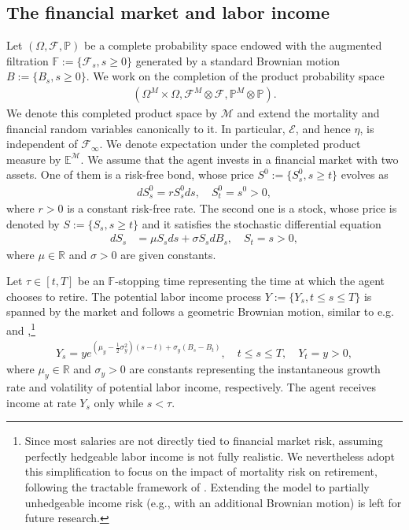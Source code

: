 \documentclass[a4paper,11pt]{amsart}
\numberwithin{equation}{section}
\begin{document}
\subsection{The financial market and labor income}
{
Let $({\Omega},{\mathcal{F}},{\mathbb{P}})$ be a complete probability space endowed with the augmented filtration $\mathbb{F}:=\{\mathcal{F}_s,s\geq0\}$ generated by a standard Brownian motion $B:=\{B_s,s\geq0\}$. We work on the completion of the product probability space
\begin{align*}
(\Omega^M\times\Omega,\mathcal{F}^M\otimes\mathcal{F},\mathbb{P}^M\otimes\mathbb{P}).
\end{align*}
We denote this completed product space by $\mathcal{M}$ and extend the mortality and financial random variables canonically to it. In particular, $\mathcal{E}$, and hence $\eta$, is independent of $\mathcal{F}_\infty$. We denote expectation under the completed product measure by $\mathbb{E}^{\mathcal{M}}$.
}
We assume that the agent invests in a financial market with two assets. One of them is a risk-free bond, whose price $S^0:=\{ S^0_s, s \geq t \}$ evolves as 
\begin{align*}
dS^0_s=rS^0_s ds, \quad S^0_t=s^0>0,
\end{align*}
where $r>0$ is a constant risk-free rate. The second one is a stock, whose price is denoted by $S:=\{S_s, s\geq t\}$ and it satisfies the stochastic differential equation
\begin{align*}
dS_s &= \mu S_s ds + \sigma S_s dB_s, \quad S_t=s>0,
\end{align*}
where $\mu \in \mathbb{R}$ and $\sigma>0$ are given constants.
\enlargethispage{3pt}


Let $\tau\in[t,T]$ be an $\mathbb{F}$-stopping time representing the time at which the agent chooses to retire. The potential labor income process $Y:=\{Y_s,t\leq s\leq T\}$ is spanned by the market and follows a geometric Brownian motion, similar to e.g.\ \citet{bodie2004optimal} and \citet{dybvig2010lifetime},\footnote{Since most salaries are not directly tied to financial market risk, assuming perfectly hedgeable labor income is not fully realistic. We nevertheless adopt this simplification to focus on the impact of mortality risk on retirement, following the tractable framework of \citep{bodie2004optimal, dybvig2010lifetime}. Extending the model to partially unhedgeable income risk (e.g., with an additional Brownian motion) is left for future research.}
\begin{align}\label{2-4-1}
Y_s=y e^{(\mu_y-\frac{1}{2}\sigma_y^2)(s-t)+\sigma_y(B_s-B_t)}, \quad t\leq s\leq T, \quad Y_t=y>0,
\end{align}
where $\mu_y\in\mathbb{R}$ and $\sigma_y>0$ are constants representing the instantaneous growth rate and volatility of potential labor income, respectively. The agent receives income at rate $Y_s$ only while $s<\tau$.
\end{document}
